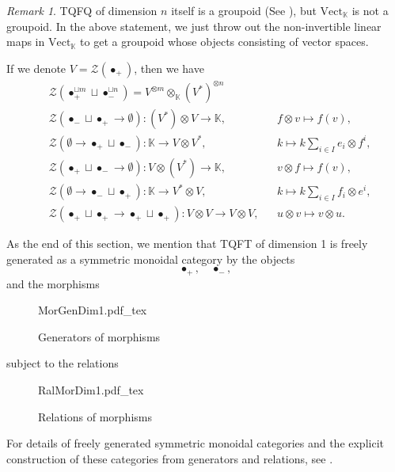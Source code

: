\documentclass[10pt,reqno,final]{article}
\newcommand{\incfig}[1]{%
    \def\svgscale{0.38}
    {#1.pdf_tex}
}
\numberwithin{equation}{section}
\numberwithin{figure}{section}
\numberwithin{table}{section}
\theoremstyle{plain}
\theoremstyle{definition}
\theoremstyle{remark}
\newtheorem{remark}{Remark}[theorem]
\begin{document}
    \begin{remark}
      TQFQ of dimension \(n\) itself is a groupoid (See \cite[\S 2.5]{carquevilleIntroductoryLecturesTopological2018}), but \(\mathrm{Vect}_{\mathbb{K}}\) is not a groupoid. In the above statement, we just throw out the non-invertible linear maps in \(\mathrm{Vect}_{\mathbb{K}}\) to get a groupoid whose objects consisting of vector spaces.
    \end{remark}
    If we denote \(V=\mathcal{Z}(\bullet_{+})\), then we have 
    \begin{align}
      &\mathcal{Z}(\bullet_{+}^{\sqcup m}\sqcup\bullet_{-}^{\sqcup n})=V^{\otimes m}\otimes_{\mathbb{K}}(V^{*})^{\otimes n}\\ 
      &\mathcal{Z}(\bullet_{-}\sqcup\bullet_{+}\to \emptyset): (V^{*})\otimes V \to \mathbb{K},&&f\otimes v\mapsto f(v ),\\
      &\mathcal{Z}(\emptyset\to\bullet_{+}\sqcup\bullet_{-}):\mathbb{K}\to V\otimes V^{*}, &&k\mapsto k \sum_{i\in I}e_{i}\otimes f^{i},\\
      & \mathcal{Z}(\bullet_{+}\sqcup\bullet_{-}\to \emptyset): V\otimes(V^{*}) \to \mathbb{K},&&v\otimes f\mapsto f(v ),\\
      &\mathcal{Z}(\emptyset\to\bullet_{-}\sqcup\bullet_{+}):\mathbb{K}\to V^{*}\otimes V, &&k\mapsto k \sum_{i\in I}f_{i}\otimes e^{i},\\
      &\mathcal{Z}(\bullet_{+}\sqcup\bullet_{+}\to \bullet_{+}\sqcup\bullet_{+}):V\otimes V\to V\otimes V ,&&u\otimes v\mapsto v\otimes u.
    \end{align}

    As the end of this section, we mention that TQFT of dimension 1 is freely generated as a symmetric monoidal category by the objects 
    \begin{equation}
      \bullet_{+},\quad \bullet_{-},
    \end{equation}
    and the morphisms 
\begin{figure}[H]
  \centering
  \incfig{MorGenDim1}
  \caption{Generators of morphisms}
  \label{fig:MorGenDim1}
\end{figure}
    subject to the relations
\begin{figure}[H]
  \centering
  \incfig{RalMorDim1}
  \caption{Relations of morphisms}
  \label{fig:RalMorDim1}
\end{figure}

    For details of freely generated symmetric monoidal categories and the explicit construction of these categories from generators and relations, see \cite[\S 3.2]{carquevilleIntroductoryLecturesTopological2018}.
\end{document}
